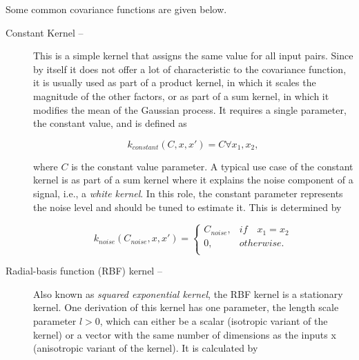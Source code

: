 Some common covariance functions are given below.


\begin{description}
	
	\item[Constant Kernel -- ]
	This is a simple kernel that assigns the same value for all input pairs.
	Since by itself it does not offer a lot of characteristic to the covariance function, it is usually used as part of a product kernel, in which it scales the magnitude of the other factors, or as part of a sum kernel, in which it modifies the mean of the Gaussian process.
	It requires a single parameter, the constant value, and is defined as 
	
	\begin{equation}
	\label{eq:constant_kernel}
	k_{constant}(C, x, x') = C\forall x_1, x_2,
	\end{equation}
	
	where $C$ is the constant value parameter.
	A typical use case of the constant kernel is as part of a sum kernel where it explains the noise component of a signal, i.e., a \textit{white kernel}.
	In this role, the constant parameter represents the noise level and should be tuned to estimate it.
	This is determined by
	
	\begin{equation}
	\label{eq:noise_kernel}
	k_{noise}(C_{noise}, x, x') =
	\begin{cases}
	C_{noise}, & if\quad x_1 = x_2\\
	0, & otherwise.\\
	\end{cases}
	\end{equation}
	
	\item[Radial-basis function (RBF) kernel --]
	Also known as \textit{squared exponential kernel}, the RBF kernel is a stationary kernel.
	One derivation of this kernel has one parameter, the length scale parameter $l > 0$, which can either be a scalar (isotropic variant of the kernel) or a vector with the same number of dimensions as the inputs x (anisotropic variant of the kernel).
	It is calculated by
	

\end{description}
